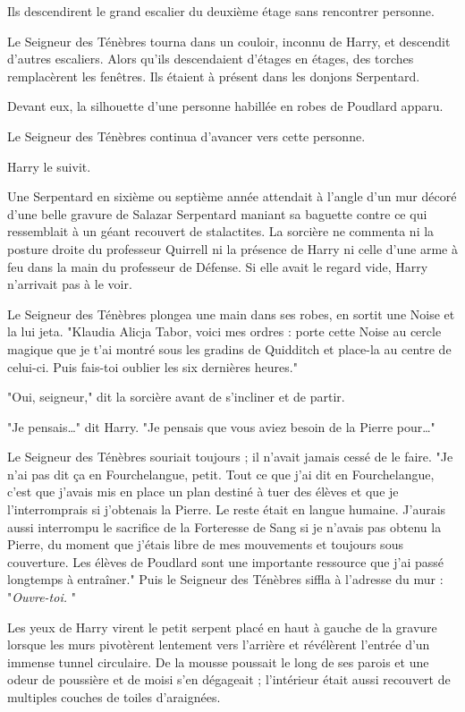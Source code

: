 Ils descendirent le grand escalier du deuxième étage sans rencontrer personne.

Le Seigneur des Ténèbres tourna dans un couloir, inconnu de Harry, et descendit d'autres escaliers. Alors qu'ils descendaient d'étages en étages, des torches remplacèrent les fenêtres. Ils étaient à présent dans les donjons Serpentard.

Devant eux, la silhouette d'une personne habillée en robes de Poudlard apparu.

Le Seigneur des Ténèbres continua d'avancer vers cette personne.

Harry le suivit.

Une Serpentard en sixième ou septième année attendait à l'angle d'un mur décoré d'une belle gravure de Salazar Serpentard maniant sa baguette contre ce qui ressemblait à un géant recouvert de stalactites. La sorcière ne commenta ni la posture droite du professeur Quirrell ni la présence de Harry ni celle d'une arme à feu dans la main du professeur de Défense. Si elle avait le regard vide, Harry n'arrivait pas à le voir.

Le Seigneur des Ténèbres plongea une main dans ses robes, en sortit une Noise et la lui jeta. "Klaudia Alicja Tabor, voici mes ordres : porte cette Noise au cercle magique que je t'ai montré sous les gradins de Quidditch et place-la au centre de celui-ci. Puis fais-toi oublier les six dernières heures."

"Oui, seigneur," dit la sorcière avant de s'incliner et de partir.

"Je pensais…" dit Harry. "Je pensais que vous aviez besoin de la Pierre pour…"

Le Seigneur des Ténèbres souriait toujours ; il n'avait jamais cessé de le faire. "Je n'ai pas dit ça en Fourchelangue, petit. Tout ce que j'ai dit en Fourchelangue, c'est que j'avais mis en place un plan destiné à tuer des élèves et que je l'interromprais si j'obtenais la Pierre. Le reste était en langue humaine. J'aurais aussi interrompu le sacrifice de la Forteresse de Sang si je n'avais pas obtenu la Pierre, du moment que j'étais libre de mes mouvements et toujours sous couverture. Les élèves de Poudlard sont une importante ressource que j'ai passé longtemps à entraîner." Puis le Seigneur des Ténèbres siffla à l'adresse du mur : "\emph{Ouvre-toi.} "

Les yeux de Harry virent le petit serpent placé en haut à gauche de la gravure lorsque les murs pivotèrent lentement vers l'arrière et révélèrent l'entrée d'un immense tunnel circulaire. De la mousse poussait le long de ses parois et une odeur de poussière et de moisi s'en dégageait ; l'intérieur était aussi recouvert de multiples couches de toiles d'araignées.

